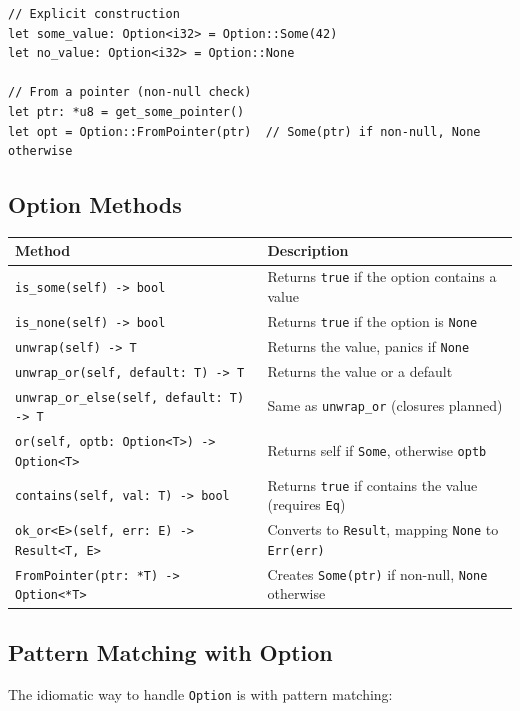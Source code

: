 \begin{lstlisting}
// Explicit construction
let some_value: Option<i32> = Option::Some(42)
let no_value: Option<i32> = Option::None

// From a pointer (non-null check)
let ptr: *u8 = get_some_pointer()
let opt = Option::FromPointer(ptr)  // Some(ptr) if non-null, None otherwise
\end{lstlisting}

\subsection{Option Methods}

\begin{center}
\begin{tabular}{lp{8cm}}
\textbf{Method} & \textbf{Description} \\
\hline
\texttt{is\_some(self) -> bool} & Returns \texttt{true} if the option contains a value \\
\texttt{is\_none(self) -> bool} & Returns \texttt{true} if the option is \texttt{None} \\
\texttt{unwrap(self) -> T} & Returns the value, panics if \texttt{None} \\
\texttt{unwrap\_or(self, default: T) -> T} & Returns the value or a default \\
\texttt{unwrap\_or\_else(self, default: T) -> T} & Same as \texttt{unwrap\_or} (closures planned) \\
\texttt{or(self, optb: Option<T>) -> Option<T>} & Returns self if \texttt{Some}, otherwise \texttt{optb} \\
\texttt{contains(self, val: T) -> bool} & Returns \texttt{true} if contains the value (requires \texttt{Eq}) \\
\texttt{ok\_or<E>(self, err: E) -> Result<T, E>} & Converts to \texttt{Result}, mapping \texttt{None} to \texttt{Err(err)} \\
\texttt{FromPointer(ptr: *T) -> Option<*T>} & Creates \texttt{Some(ptr)} if non-null, \texttt{None} otherwise \\
\end{tabular}
\end{center}

\subsection{Pattern Matching with Option}

The idiomatic way to handle \texttt{Option} is with pattern matching:

